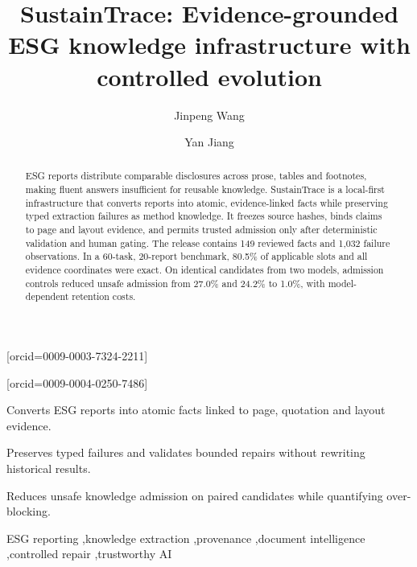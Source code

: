 \documentclass[a4paper,fleqn]{cas-sc}
\begin{document}
\let\WriteBookmarks\relax
\def\floatpagepagefraction{1}
\def\textpagefraction{.001}


\title[mode=title]{SustainTrace: Evidence-grounded ESG knowledge infrastructure with controlled evolution}

\author[1]{Jinpeng Wang}[orcid=0009-0003-7324-2211]
\cormark[1]
\author[1]{Yan Jiang}[orcid=0009-0004-0250-7486]

\begin{abstract}
ESG reports distribute comparable disclosures across prose, tables and footnotes, making fluent
answers insufficient for reusable knowledge. SustainTrace is a local-first infrastructure that
converts reports into atomic, evidence-linked facts while preserving typed extraction failures as
method knowledge. It freezes source hashes, binds claims to page and layout evidence, and permits
trusted admission only after deterministic validation and human gating. The release contains 149
reviewed facts and 1,032 failure observations. In a 60-task, 20-report benchmark, 80.5\% of
applicable slots and all evidence coordinates were exact. On identical candidates from two models,
admission controls reduced unsafe admission from 27.0\% and 24.2\% to 1.0\%, with model-dependent
retention costs.
\end{abstract}

\begin{highlights}
\item Converts ESG reports into atomic facts linked to page, quotation and layout evidence.
\item Preserves typed failures and validates bounded repairs without rewriting historical results.
\item Reduces unsafe knowledge admission on paired candidates while quantifying over-blocking.
\end{highlights}

\begin{keywords}
ESG reporting \sep knowledge extraction \sep provenance \sep document intelligence \sep controlled repair \sep trustworthy AI
\end{keywords}
\end{document}
